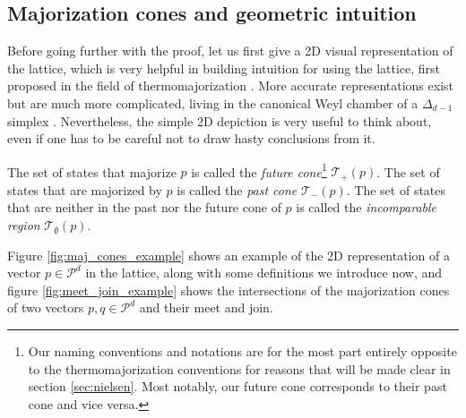 \subsection{Majorization cones and geometric intuition} \label{sec:majorization_cones}

Before going further with the proof, let us first give a 2D visual representation of the lattice, which is very helpful in building intuition for using the lattice, first proposed in the field of thermomajorization \cite{korzekwa_structure_2017}. More accurate representations exist but are much more complicated, living in the canonical Weyl chamber of a $\Delta_{d-1}$ simplex \cite{junior_geometric_2022}. Nevertheless, the simple 2D depiction is very useful to think about, even if one has to be careful not to draw hasty conclusions from it.

\begin{definition} \label{def:majorization_cones}
    The set of states that majorize $p$ is called the \textit{future cone}\footnote{Our naming conventions and notations are for the most part entirely opposite to the thermomajorization conventions for reasons that will be made clear in section \ref{sec:nielsen}. Most notably, our future cone corresponds to their past cone and vice versa.}  $\mathcal{T}_+ (p)$. The set of states that are majorized by $p$ is called the \textit{past cone} $\mathcal{T}_- (p)$. The set of states that are neither in the past nor the future cone of $p$ is called the \textit{incomparable region} $\mathcal{T}_\emptyset (p)$.
\end{definition}

Figure \ref{fig:maj_cones_example} shows an example of the 2D representation of a vector $p \in \mathcal{P}^d$ in the lattice, along with some definitions we introduce now, and figure \ref{fig:meet_join_example} shows the intersections of the majorization cones of two vectors $p, q \in \mathcal{P}^d$ and their meet and join.

